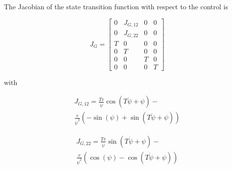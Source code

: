 \documentclass[a4paper,twoside]{article}
\begin{document}
The Jacobian of the state transition function with respect to the control is

\begin{equation}J_G=\left[\begin{matrix}0 & J_{G,12} & 0 & 0\\0 & J_{G,22} & 0 & 0\\T & 0 & 0 & 0\\0 & T & 0 & 0\\0 & 0 & T & 0\\0 & 0 & 0 & T\end{matrix}\right]\end{equation}

with

\begin{equation}
	\begin{split}
    	J_{G,12}=\frac{T v}{\dot\psi} \cos{\left (T \dot\psi + \psi \right )} - \\ 		\frac{v}{\dot\psi^{2}} \left(- \sin{\left (\psi \right )} + \sin{\left (T \dot\psi + \psi \right )}\right)
	\end{split}
\end{equation}

\begin{equation}
	\begin{split}
    	J_{G,22}=\frac{T v}{\dot\psi} \sin{\left (T \dot\psi + \psi \right )} - \\ \frac{v}{\dot\psi^{2}} \left(\cos{\left (\psi \right )} - \cos{\left (T \dot\psi + \psi \right )}\right)
    \end{split}
\end{equation}

\vfill
\end{document}
